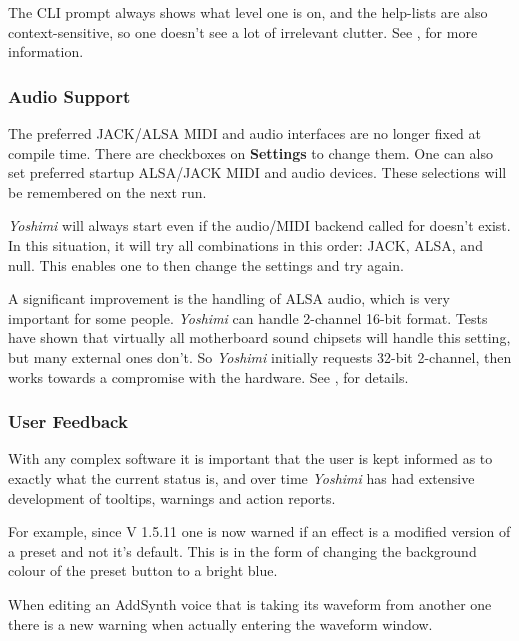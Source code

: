 \documentclass[
 11pt,
 twoside,
 a4paper,
 final                                 %
]{article}
\begin{document}
   The CLI prompt always
   shows what level one is on, and the help-lists are also
   context-sensitive, so one doesn't see a lot of irrelevant clutter.
   See , for more information.

\subsubsection{Audio Support}
\label{subsubsec:new_features_audio_support}

   The preferred JACK/ALSA MIDI and audio interfaces are no longer fixed at
   compile time. There are checkboxes on \textbf{Settings} to change them.
   One can also set preferred startup ALSA/JACK MIDI and audio devices.
   These selections will be remembered on the next run.

   \textsl{Yoshimi} will always start even if the audio/MIDI backend called
   for doesn't exist. In this situation, it will try all combinations in this
   order: JACK, ALSA, and null. This enables one to then change the settings
   and try again.

   A significant improvement is the handling of ALSA audio, which is very
   important for some people.  \textsl{Yoshimi} can handle 2-channel 16-bit
   format. Tests have shown that virtually all motherboard sound chipsets will
   handle this setting, but many external ones don't.  So \textsl{Yoshimi}
   initially requests 32-bit 2-channel, then works towards a compromise with the
   hardware.
   See , for details.

\subsubsection{User Feedback}
\label{subsubsec:new_features_user_feedback}
   With any complex software it is important that the user is kept informed
   as to exactly what the current status is, and over time \textsl{Yoshimi}
   has had extensive development of tooltips, warnings and action reports.

   For example, since V 1.5.11 one is now warned if an effect is a modified
   version of a preset and not it's default. This is in the form of changing
   the background colour of the preset button to a bright blue.

   When editing an AddSynth voice that is taking its waveform from another one
   there is a new warning when actually entering the waveform window.
\end{document}
